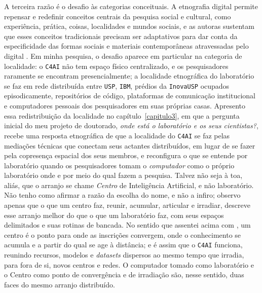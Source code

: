 A terceira razão é o desafio às categorias conceituais. A etnografia digital permite repensar e redefinir conceitos centrais da pesquisa social e cultural, como experiência, prática, coisas, localidades e mundos sociais, e as autoras sustentam que esses conceitos tradicionais precisam ser adaptativos para dar conta da especificidade das formas sociais e materiais contemporâneas atravessadas pelo digital \parencite{Pink2016DigitalEthnography}. Em minha pesquisa, o desafio aparece em particular na categoria de localidade: o \texttt{C4AI} não tem espaço físico centralizado, e os pesquisadores raramente se encontram presencialmente; a localidade etnográfica do laboratório se faz em rede distribuída entre \texttt{USP}, \texttt{IBM}, prédios da \texttt{InovaUSP} ocupados episodicamente, repositórios de código, plataformas de comunicação institucional e computadores pessoais dos pesquisadores em suas próprias casas. Apresento essa redistribuição da localidade no capítulo~\ref{capitulo3}, em que a pergunta inicial do meu projeto de doutorado, \emph{onde está o laboratório e os seus cientistas?}, recebe uma resposta etnográfica de que a localidade do \texttt{C4AI} se faz pelas mediações técnicas que conectam seus actantes distribuídos, em lugar de se fazer pela copresença espacial dos seus membros, e reconfigura o que se entende por laboratório quando os pesquisadores tomam o \textit{computador} como o próprio laboratório onde e por meio do qual fazem a pesquisa. Talvez não seja à toa, aliás, que o arranjo se chame \emph{Centro} de Inteligência Artificial, e não laboratório. Não tenho como afirmar a razão da escolha do nome, e não a infiro; observo apenas que o que um centro faz, reunir, acumular, articular e irradiar, descreve esse arranjo melhor do que o que um laboratório faz, com seus espaços delimitados e suas rotinas de bancada. No sentido que assentei acima com \textcite{Latour1986Visualization}, um centro é o ponto para onde as inscrições convergem, onde o conhecimento se acumula e a partir do qual se age à distância; e é assim que o \texttt{C4AI} funciona, reunindo recursos, modelos e \textit{datasets} dispersos ao mesmo tempo que irradia, para fora de si, novos centros e redes. O computador tomado como laboratório e o Centro como ponto de convergência e de irradiação são, nesse sentido, duas faces do mesmo arranjo distribuído.

